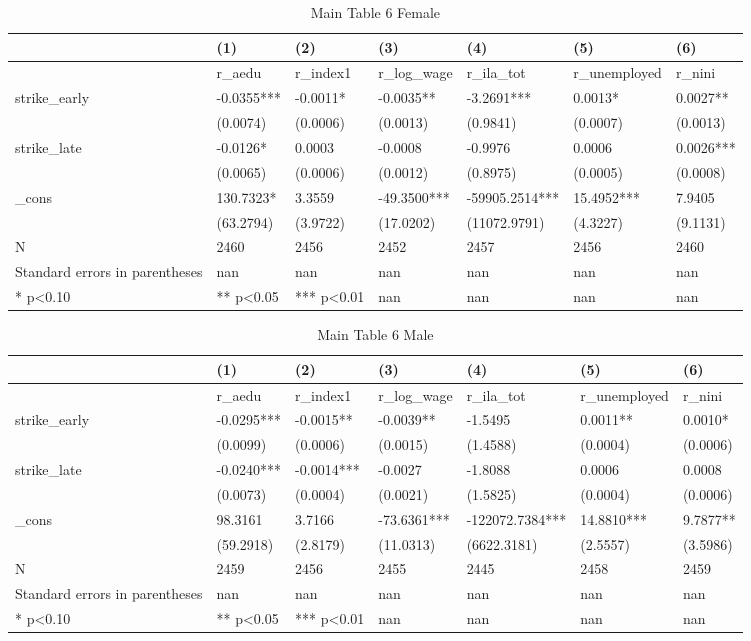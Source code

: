 \documentclass[11pt]{article}
\begin{document}
\clearpage
\begin{table}[!htbp]
\centering
\caption{Main Table 6 Female}
\label{tab:table6_f}
\begin{tabular}{lllllll}
\toprule
 & (1) & (2) & (3) & (4) & (5) & (6) \\
\midrule
 & r\_aedu & r\_index1 & r\_log\_wage & r\_ila\_tot & r\_unemployed & r\_nini \\
strike\_early & -0.0355*** & -0.0011* & -0.0035** & -3.2691*** & 0.0013* & 0.0027** \\
 & (0.0074) & (0.0006) & (0.0013) & (0.9841) & (0.0007) & (0.0013) \\
strike\_late & -0.0126* & 0.0003 & -0.0008 & -0.9976 & 0.0006 & 0.0026*** \\
 & (0.0065) & (0.0006) & (0.0012) & (0.8975) & (0.0005) & (0.0008) \\
\_cons & 130.7323* & 3.3559 & -49.3500*** & -59905.2514*** & 15.4952*** & 7.9405 \\
 & (63.2794) & (3.9722) & (17.0202) & (11072.9791) & (4.3227) & (9.1131) \\
N & 2460 & 2456 & 2452 & 2457 & 2456 & 2460 \\
Standard errors in parentheses & nan & nan & nan & nan & nan & nan \\
* p<0.10 & ** p<0.05 & *** p<0.01 & nan & nan & nan & nan \\
\bottomrule
\end{tabular}

\end{table}

\clearpage
\begin{table}[!htbp]
\centering
\caption{Main Table 6 Male}
\label{tab:table6_m}
\begin{tabular}{lllllll}
\toprule
 & (1) & (2) & (3) & (4) & (5) & (6) \\
\midrule
 & r\_aedu & r\_index1 & r\_log\_wage & r\_ila\_tot & r\_unemployed & r\_nini \\
strike\_early & -0.0295*** & -0.0015** & -0.0039** & -1.5495 & 0.0011** & 0.0010* \\
 & (0.0099) & (0.0006) & (0.0015) & (1.4588) & (0.0004) & (0.0006) \\
strike\_late & -0.0240*** & -0.0014*** & -0.0027 & -1.8088 & 0.0006 & 0.0008 \\
 & (0.0073) & (0.0004) & (0.0021) & (1.5825) & (0.0004) & (0.0006) \\
\_cons & 98.3161 & 3.7166 & -73.6361*** & -122072.7384*** & 14.8810*** & 9.7877** \\
 & (59.2918) & (2.8179) & (11.0313) & (6622.3181) & (2.5557) & (3.5986) \\
N & 2459 & 2456 & 2455 & 2445 & 2458 & 2459 \\
Standard errors in parentheses & nan & nan & nan & nan & nan & nan \\
* p<0.10 & ** p<0.05 & *** p<0.01 & nan & nan & nan & nan \\
\bottomrule
\end{tabular}

\end{table}
\end{document}
